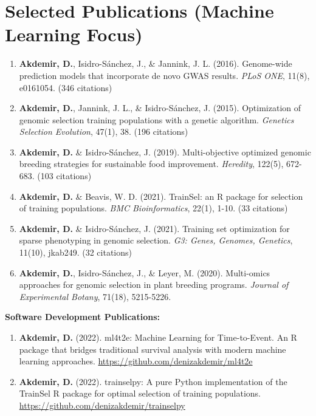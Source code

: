 \documentclass[11pt,a4paper,]{moderncv}
\begin{document}
\section{Selected Publications (Machine Learning
Focus)}\label{selected-publications-machine-learning-focus}

\begin{enumerate}
\def\labelenumi{\arabic{enumi}.}
\item
  \textbf{Akdemir, D.}, Isidro-Sánchez, J., \& Jannink, J. L. (2016).
  Genome-wide prediction models that incorporate de novo GWAS results.
  \emph{PLoS ONE}, 11(8), e0161054. (346 citations)
\item
  \textbf{Akdemir, D.}, Jannink, J. L., \& Isidro-Sánchez, J. (2015).
  Optimization of genomic selection training populations with a genetic
  algorithm. \emph{Genetics Selection Evolution}, 47(1), 38. (196
  citations)
\item
  \textbf{Akdemir, D.} \& Isidro-Sánchez, J. (2019). Multi-objective
  optimized genomic breeding strategies for sustainable food
  improvement. \emph{Heredity}, 122(5), 672-683. (103 citations)
\item
  \textbf{Akdemir, D.} \& Beavis, W. D. (2021). TrainSel: an R package
  for selection of training populations. \emph{BMC Bioinformatics},
  22(1), 1-10. (33 citations)
\item
  \textbf{Akdemir, D.} \& Isidro-Sánchez, J. (2021). Training set
  optimization for sparse phenotyping in genomic selection. \emph{G3:
  Genes, Genomes, Genetics}, 11(10), jkab249. (32 citations)
\item
  \textbf{Akdemir, D.}, Isidro-Sánchez, J., \& Leyer, M. (2020).
  Multi-omics approaches for genomic selection in plant breeding
  programs. \emph{Journal of Experimental Botany}, 71(18), 5215-5226.
\end{enumerate}

\textbf{Software Development Publications:}

\begin{enumerate}
\def\labelenumi{\arabic{enumi}.}
\item
  \textbf{Akdemir, D.} (2022). ml4t2e: Machine Learning for
  Time-to-Event. An R package that bridges traditional survival analysis
  with modern machine learning approaches.
  \url{https://github.com/denizakdemir/ml4t2e}
\item
  \textbf{Akdemir, D.} (2022). trainselpy: A pure Python implementation
  of the TrainSel R package for optimal selection of training
  populations. \url{https://github.com/denizakdemir/trainselpy}
\end{enumerate}
\end{document}

